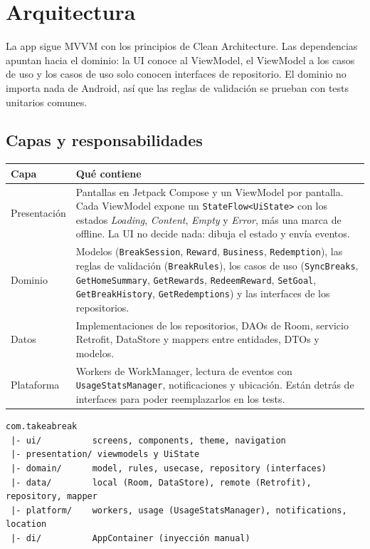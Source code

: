 \section{Arquitectura}
\label{sec:arquitectura}

La app sigue MVVM con los principios de Clean Architecture. Las dependencias apuntan hacia el dominio: la UI conoce al ViewModel, el ViewModel a los casos de uso y los casos de uso solo conocen interfaces de repositorio. El dominio no importa nada de Android, así que las reglas de validación se prueban con tests unitarios comunes.

\subsection{Capas y responsabilidades}

\begin{table}[H]
\centering\small
\begin{tabularx}{\textwidth}{@{}l L@{}}
\toprule
\textbf{Capa} & \textbf{Qué contiene} \\
\midrule
Presentación & Pantallas en Jetpack Compose y un ViewModel por pantalla. Cada ViewModel expone un \texttt{StateFlow<UiState>} con los estados \textit{Loading}, \textit{Content}, \textit{Empty} y \textit{Error}, más una marca de offline. La UI no decide nada: dibuja el estado y envía eventos. \\
Dominio & Modelos (\texttt{BreakSession}, \texttt{Reward}, \texttt{Business}, \texttt{Redemption}), las reglas de validación (\texttt{BreakRules}), los casos de uso (\texttt{SyncBreaks}, \texttt{GetHomeSummary}, \texttt{GetRewards}, \texttt{RedeemReward}, \texttt{SetGoal}, \texttt{GetBreakHistory}, \texttt{GetRedemptions}) y las interfaces de los repositorios. \\
Datos & Implementaciones de los repositorios, DAOs de Room, servicio Retrofit, DataStore y mappers entre entidades, DTOs y modelos. \\
Plataforma & Workers de WorkManager, lectura de eventos con \texttt{UsageStatsManager}, notificaciones y ubicación. Están detrás de interfaces para poder reemplazarlos en los tests. \\
\bottomrule
\end{tabularx}
\end{table}

\noindent\begin{minipage}{\linewidth}
\begin{lstlisting}
com.takeabreak
 |- ui/          screens, components, theme, navigation
 |- presentation/ viewmodels y UiState
 |- domain/      model, rules, usecase, repository (interfaces)
 |- data/        local (Room, DataStore), remote (Retrofit), repository, mapper
 |- platform/    workers, usage (UsageStatsManager), notifications, location
 |- di/          AppContainer (inyección manual)
\end{lstlisting}
\end{minipage}

